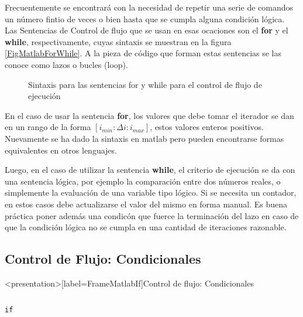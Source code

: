 
Frecuentemente se encontrará con la necesidad de repetir una serie de 
comandos un número fintio de veces o bien hasta que se cumpla alguna 
condición lógica. Las Sentencias de Control de flujo que se usan en esas 
ocaciones son el \textbf{for} y el \textbf{while}, respectivamente, 
cuyas sintaxis se muestran en la figura \autoref{FigMatlabForWhile}. A la pieza de
código que forman estas sentencias se las conoce como
lazos o bucles (loop).

\begin{figure}
  \caption{
    Sintaxis para las sentencias for y while
  para el control de flujo de ejecución \label{FigMatlabForWhile}
}
\end{figure}

En el caso de usar la sentencia \textbf{for}, los valores que debe tomar
el iterador se dan en un rango de la forma  $[ i_{min} :  \Delta i : i_{max} ]$, 
estos valores enteros positivos. Nuevamente se ha dado la sintaxis en matlab
pero pueden encontrarse formas equivalentes en otros lenguajes. 

Luego, en el caso de utilizar la sentencia \textbf{while}, el criterio 
de ejecución se da con una sentencia lógica, por ejemplo la comparación
entre dos números reales, o simplemente la evaluación de una 
variable tipo lógico. Si se necesita un contador, en estos casos
debe actualizarse el valor del mismo en forma manual. Es buena
práctica poner además una condicón que fuerce la terminación  
del lazo en caso de que la condición lógica no se cumpla 
en una cantidad de iteraciones razonable. 

\mode*

\subsection{Control de Flujo: Condicionales}

\begin{frame}<presentation>[label=FrameMatlabIf]{Control de flujo: Condicionales} 
\begin{columns}[T]
\hfill \large\texttt{if}

\begin{codeblock}

\end{codeblock}

\begin{codeblock}

\end{codeblock}

\end{columns}
\end{frame}

